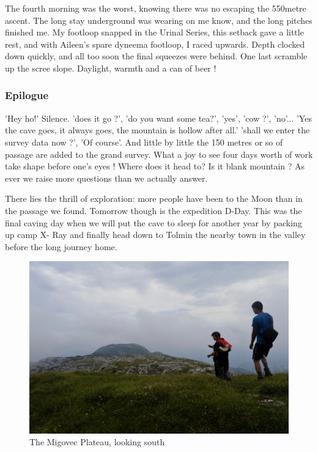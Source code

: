 \documentclass[onecolumn]{book}
\begin{document}
The fourth morning was the worst, knowing there was no escaping the 550metre ascent. The long stay underground was wearing on me know, and the long pitches finished me. My footloop snapped in the Urinal Series, this setback gave a little rest, and with Aileen's spare dyneema footloop, I raced upwards. Depth clocked down quickly, and all too soon the final squeezes were behind. One last scramble up the scree slope. Daylight, warmth and a can of beer !

\subsubsection{Epilogue}
'Hey ho!' Silence. 'does it go ?', 'do you want some tea?', 'yes', 'cow ?', 'no'...
'Yes the cave goes, it always goes, the mountain is hollow after all.' 'shall we enter the survey data now ?', 'Of course'. And little by little the 150 metres or so of passage are added to the grand survey. What a joy to see four days worth of work take shape before one's eyes ! Where does it head to? Is it blank mountain ? As ever we raise more questions than we actually answer.

There lies the thrill of exploration: more people have been to the Moon than in the passage we found. Tomorrow though is the expedition D-Day. This was the final caving day when we will put the cave to sleep for another year by packing up camp X- Ray and finally head down to Tolmin the nearby town in the valley before the long journey home. 

\begin{figure}[h]
\centering
\includegraphics[width=\textwidth]{The plateau.jpg}
\caption{The Migovec Plateau, looking south}
\label{the plateau}
\end{figure}
\end{document}
